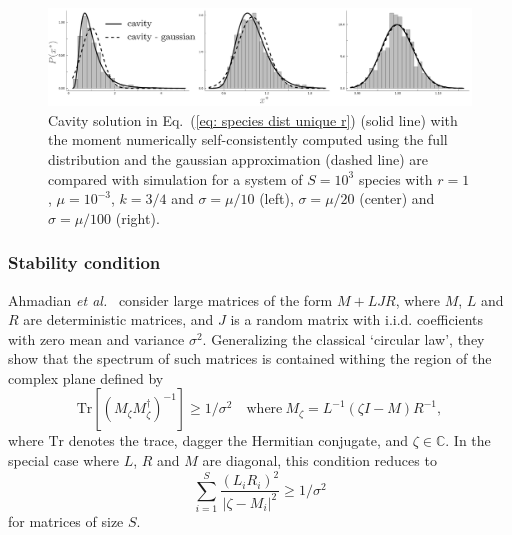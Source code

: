 \documentclass[10pt]{article}
\begin{document}
\begin{figure}[h!]
    \centering
    \includegraphics[width=1\textwidth]{fig/SM-cavity+gaussian.pdf}
    \caption{Cavity solution in Eq.~(\ref{eq: species dist unique r}) (solid line) 
    with the moment numerically self-consistently computed using the
    full distribution and the gaussian approximation (dashed line)
    are compared with simulation for a system 
    of $S=10^3$ species with
    $r=1$, $\mu=10^{-3}$, $k=3/4$ and $\sigma=\mu/10$ (left),
    $\sigma=\mu/20$ (center) and $\sigma=\mu/100$ (right).}
    \label{fig: SM cavity + gauss}
\end{figure}

\subsubsection{Stability condition}

Ahmadian \emph{et al.}~\cite{ahmadianProperties2015} consider large matrices of the form $M + LJR$, where $M$,  $L$ and $R$ are deterministic matrices, and $J$ is a random matrix with i.i.d. coefficients with zero mean and variance $\sigma^2$. Generalizing the classical `circular law', they show that the spectrum of such matrices is contained withing the region of the complex plane defined by 
\begin{equation}
    \textrm{Tr}[(M_\zeta M_\zeta^\dagger)^{-1}]\geq 1/\sigma^2 \quad \textrm{where}\ M_\zeta = L^{-1}(\zeta I - M)R^{-1}, 
\end{equation}
where $\textrm{Tr}$ denotes the trace, dagger the Hermitian conjugate, and $\zeta\in\mathbb{C}$. In the special case where $L$, $R$ and $M$ are diagonal, this condition reduces to
\begin{equation}
    \sum_{i=1}^S\frac{(L_{i}R_{i})^2}{ \vert \zeta - M_{i}\vert^2 }\geq 1/\sigma^2
\end{equation}
for matrices of size $S$. 
\end{document}

